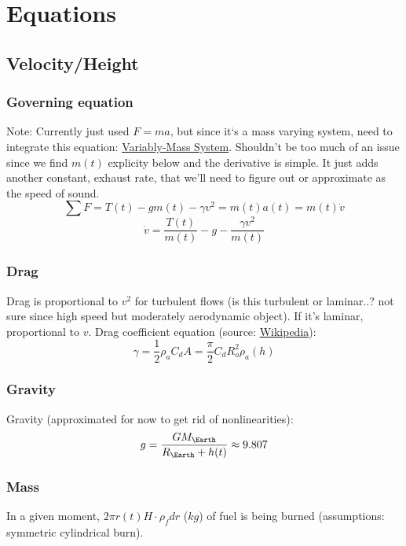 \documentclass[12pt,a4paper]{article}
\begin{document}
\section{Equations}
\subsection{Velocity/Height}
\subsubsection{Governing equation}
Note: Currently just used $F=ma$, but since it‘s a mass varying system, need to integrate this equation: \hyperlink{’https://en.wikipedia.org/wiki/Variable-mass_system}{Variably-Mass System}. Shouldn’t be too much of an issue since we find $m(t)$ explicity below and the derivative is simple. It just adds another constant, exhaust rate, that we’ll need to figure out or approximate as the speed of sound.
$$\sum F = T(t) - gm(t) - \gamma v^2 = m(t)a(t) = m(t)\dot{v}$$
\begin{equation}
\dot{v} = \frac{T(t)}{m(t)} - g - \frac{\gamma v^2}{m(t)}
\label{eq:main}
\end{equation}

\subsubsection{Drag}
Drag is proportional to $v^2$ for turbulent flows (is this turbulent or laminar..? not sure since high speed but moderately aerodynamic object). If it’s laminar, proportional to $v$.
Drag coefficient equation (source: \href{https://en.wikipedia.org/wiki/Drag_(physics)#Types_of_drag}{Wikipedia}):
\begin{equation}
\gamma = \frac{1}{2}\rho_a C_d A = \frac{\pi}{2} C_d R_o^2\rho_a(h)
\label{eq:gamma}
\end{equation}

\subsubsection{Gravity}
Gravity (approximated for now to get rid of nonlinearities):
$$g=\frac{GM_{\Earth}}{R_{\Earth} + h(t)} \approx 9.807$$

\subsubsection{Mass}
In a given moment, $2\pi r(t) H \cdot \rho_f dr$ ($kg$) of fuel is being burned (assumptions: symmetric cylindrical burn).
\end{document}
